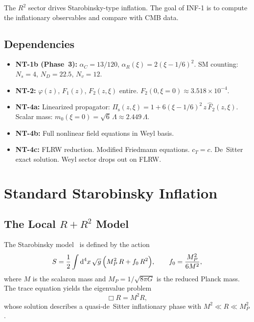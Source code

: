 \documentclass[11pt,a4paper]{article}
\renewcommand{\dd}{\mathrm{d}}
\newcommand{\Fhat}{\hat{F}}
\newcommand{\Pis}{\Pi_{\mathrm{s}}}
\theoremstyle{plain}
\theoremstyle{definition}
\begin{document}
The $R^2$ sector drives Starobinsky-type inflation. The goal of INF-1 is
to compute the inflationary observables and compare with CMB data.

\subsection{Dependencies}
\begin{itemize}[nosep]
  \item \textbf{NT-1b (Phase~3):} $\alpha_C = 13/120$,
    $\alpha_R(\xi) = 2(\xi - 1/6)^2$. SM counting:
    $N_s = 4$, $N_D = 22.5$, $N_v = 12$.
  \item \textbf{NT-2:} $\varphi(z)$, $F_1(z)$, $F_2(z,\xi)$ entire.
    $F_2(0,\xi=0) \approx 3.518 \times 10^{-4}$.
  \item \textbf{NT-4a:} Linearized propagator:
    $\Pis(z,\xi) = 1 + 6(\xi-1/6)^2\,z\,\Fhat_2(z,\xi)$.
    Scalar mass: $m_0(\xi=0) = \sqrt{6}\,\Lambda \approx 2.449\,\Lambda$.
  \item \textbf{NT-4b:} Full nonlinear field equations in Weyl basis.
  \item \textbf{NT-4c:} FLRW reduction. Modified Friedmann equations.
    $c_T = c$. De~Sitter exact solution. Weyl sector drops out on FLRW.
\end{itemize}

\section{Standard Starobinsky Inflation}\label{sec:starobinsky}

\subsection{The Local $R + R^2$ Model}

The Starobinsky model~\cite{Star80} is defined by the action
\begin{equation}\label{eq:starobinsky-action}
  S = \frac{1}{2}\int \dd^4 x\,\sqrt{g}\,
  \Bigl(M_P^2\,R + f_0\,R^2\Bigr),
  \qquad f_0 = \frac{M_P^2}{6M^2},
\end{equation}
where $M$ is the scalaron mass and $M_P = 1/\sqrt{8\pi G}$ is the
reduced Planck mass. The trace equation yields the eigenvalue problem
\begin{equation}\label{eq:eigenvalue}
  \Box R = M^2 R,
\end{equation}
whose solution describes a quasi-de~Sitter inflationary phase with
$M^2 \ll R \ll M_P^2$.
\end{document}
